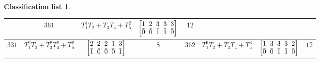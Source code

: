 \documentclass[pdftex]{sigma}%
\theoremstyle{definition}
\newtheorem{class-list}[thm]{Classification list}
\numberwithin{equation}{section}
\begin{document}
\begin{class-list}
\begin{table}[h!]
\begin{tabu}{c|c|c|c||c|c|c|c}
&${361}$&${T_{1}^{4}T_{2}+T_{3}T_{4}+T_{5}^{2}}$
&$\arraycolsep=1mm\begin{bmatrix}{1} & {2} & {3} & {3} & {3} \\ {\bar{0}} & {\bar{0}} & {\bar{1}} & {\bar{1}} & {\bar{0}}\end{bmatrix}$&${12}$
\\
\hline
${331}$&${T_{1}^{2}T_{2}+T_{3}^{2}T_{4}^{2}+T_{5}^{2}}$
&$\arraycolsep=1mm\begin{bmatrix}{2} & {2} & {2} & {1} & {3} \\ {\bar{1}} & {\bar{0}} & {\bar{0}} & {\bar{0}} & {\bar{1}}\end{bmatrix}$&${8}$
&${362}$&${T_{1}^{3}T_{2}+T_{3}T_{4}+T_{5}^{3}}$
&$\arraycolsep=1mm\begin{bmatrix}{1} & {3} & {3} & {3} & {2} \\ {\bar{0}} & {\bar{0}} & {\bar{1}} & {\bar{1}} & {\bar{0}}\end{bmatrix}$&${12}$
\\
\hline
\end{tabu}\vspace{6mm}
\end{table}



\end{class-list}
\end{document}
